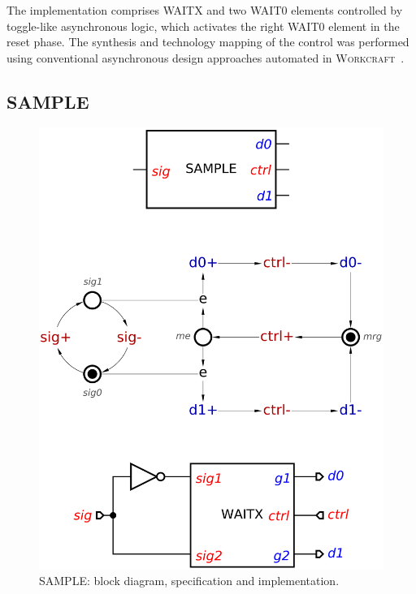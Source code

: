 \documentclass[conference]{IEEEtran}
\begin{document}
The implementation comprises \textsf{WAITX} and two \textsf{WAIT0} elements controlled
by toggle-like asynchronous logic, which activates the right \textsf{WAIT0} element in the
reset phase. The synthesis and technology mapping of the control was performed using
conventional asynchronous design approaches automated in
\textsc{Workcraft}~\cite{2017_sokolov_a4a}.

\subsection*{\textsf{SAMPLE}}

\begin{figure}
\begin{center}
    \includegraphics[scale=0.23]{fig/SAMPLE.pdf}
    \caption{\textsf{SAMPLE}: block diagram, specification and implementation.}
    \label{fig:sample}
    \vspace{-6mm}
\end{center}
\end{figure}
\end{document}
